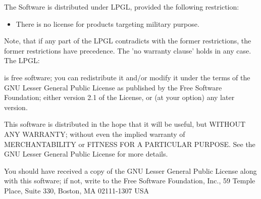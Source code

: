 The Software is distributed under LPGL, provided the following restriction:

\begin{itemize}
\item There is no license for products targeting military purpose.
\end{itemize}

Note, that if any part of the LPGL contradicts with the former restrictions,
the former restrictions have precedence. The 'no warranty clause' holds
in any case. The LPGL:

{\Quex} is  free software; you can redistribute  it and/or modify
it  under  the terms  of  the GNU  Lesser  General  Public License  as
published by the  Free Software Foundation; either version  2.1 of the
License, or (at your option) any later version.

This software  is distributed in the  hope that it will  be useful, but
WITHOUT   ANY  WARRANTY;   without  even   the  implied   warranty  of
MERCHANTABILITY  or FITNESS  FOR A  PARTICULAR PURPOSE.   See  the GNU
Lesser General Public License for more details.

You  should have  received a  copy of  the GNU  Lesser  General Public
License along  with this software; if  not, write to  the Free Software
Foundation, Inc.,  59 Temple Place,  Suite 330, Boston,  MA 02111-1307
USA
